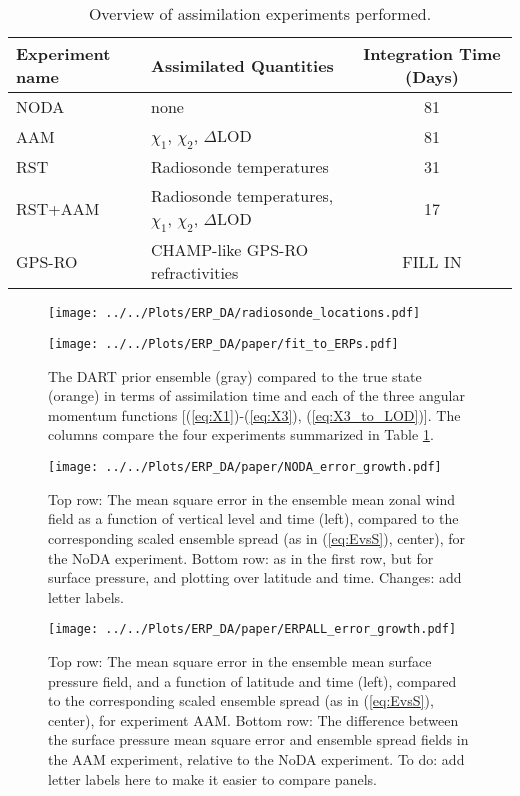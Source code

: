 
\begin{table}
\caption{Overview of assimilation experiments performed.}
\centering
\begin{tabular}{llc}
Experiment name &  Assimilated Quantities  & Integration Time (Days) \\
\hline
NODA  &  none	& 81 				\\
AAM  &  $\chi_1$, $\chi_2$, $\Delta$LOD		& 81\\
RST  &  Radiosonde temperatures	& 31	\\
RST+AAM	 &  Radiosonde temperatures, $\chi_1$, $\chi_2$, $\Delta$LOD	& 17\\
\textcolor{unsure}{GPS-RO}	& \textcolor{unsure}{CHAMP-like GPS-RO refractivities} & \textcolor{alert}{FILL IN}	\\
\hline
\end{tabular}
\label{tab:expts}
\end{table}

 \begin{figure}
\texttt{[image: ../../Plots/ERP\_DA/radiosonde\_locations.pdf]} 
 \caption{  }
 \label{fig:RS}
\end{figure}

 \begin{figure}
\texttt{[image: ../../Plots/ERP\_DA/paper/fit\_to\_ERPs.pdf]} 
 \caption{ The DART prior ensemble (gray) compared to the true state (orange) in terms of assimilation time and each of the three angular momentum functions [(\ref{eq:X1})-(\ref{eq:X3}), (\ref{eq:X3_to_LOD})].  The columns compare the four experiments summarized in Table \ref{tab:expts}.  }
 \label{fig:fit_to_ERPs}
\end{figure}

 \begin{figure}
\texttt{[image: ../../Plots/ERP\_DA/paper/NODA\_error\_growth.pdf]} 
 \caption{Top row: The mean square error in the ensemble mean zonal wind field as a function of vertical level and time (left), compared to the corresponding scaled ensemble spread (as in (\ref{eq:EvsS}), center), for the NoDA experiment.  Bottom row: as in the first row, but for surface pressure, and plotting over latitude and time. \textcolor{alert}{Changes: add letter labels.} }
 \label{fig:NODA}
\end{figure}



 \begin{figure}
\texttt{[image: ../../Plots/ERP\_DA/paper/ERPALL\_error\_growth.pdf]} 
 \caption{ Top row: The mean square error in the ensemble mean surface pressure field, and a function of latitude and time (left), compared to the corresponding scaled ensemble spread (as in (\ref{eq:EvsS}), center), for experiment AAM.  Bottom row: The difference between the surface pressure mean square error and ensemble spread fields in the AAM experiment, relative to the NoDA experiment.  \textcolor{alert}{To do: add letter labels here to make it easier to compare panels. }  }
 \label{fig:ERPDA_error_growth}
\end{figure}



